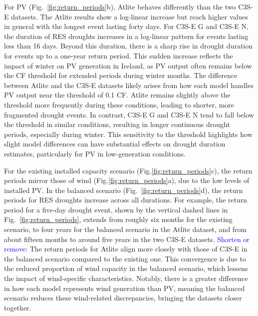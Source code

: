 \documentclass[a4paper, 11pt]{article}
\begin{document}
For PV (Fig.~\ref{fig:return_periods}b), Atlite behaves differently than the two C3S-E datasets. The Atlite results show a log-linear increase but reach higher values in general with the longest event lasting forty days. For C3S-E G and C3S-E N, the duration of RES droughts increases in a log-linear pattern for events lasting less than 16 days. Beyond this duration, there is a sharp rise in drought duration for events up to a one-year return period. This sudden increase reflects the impact of winter on PV generation in Ireland, as PV output often remains below the CF threshold for extended periods during winter months. The difference between Atlite and the C3S-E datasets likely arises from how each model handles PV output near the threshold of 0.1 CF. Atlite remains slightly above the threshold more frequently during these conditions, leading to shorter, more fragmented drought events. In contrast, C3S-E G and C3S-E N tend to fall below the threshold in similar conditions, resulting in longer continuous drought periods, especially during winter. This sensitivity to the threshold highlights how slight model differences can have substantial effects on drought duration estimates, particularly for PV in low-generation conditions.

For the existing installed capacity scenario (Fig.\ref{fig:return_periods}c), the return periods mirror those of wind (Fig.\ref{fig:return_periods}a), due to the low levels of installed PV. In the balanced scenario (Fig.~\ref{fig:return_periods}d), the return periods for RES droughts increase across all durations. For example, the return period for a five-day drought event, shown by the vertical dashed lines in Fig.~\ref{fig:return_periods}, extends from roughly six months for the existing scenario, to four years for the balanced scenario in the Atlite dataset, and from about fifteen months to around five years in the two C3S-E datasets. \textcolor{blue}{Shorten or remove: }The return periods for Atlite align more closely with those of C3S-E in the balanced scenario compared to the existing one. This convergence is due to the reduced proportion of wind capacity in the balanced scenario, which lessens the impact of wind-specific characteristics. Notably, there is a greater difference in how each model represents wind generation than PV, meaning the balanced scenario reduces these wind-related discrepancies, bringing the datasets closer together.
\end{document}
